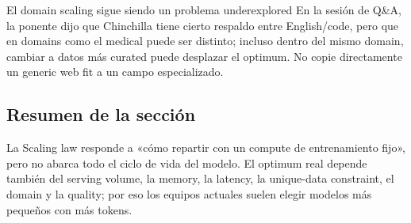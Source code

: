 
\begin{warningbox}{El domain scaling sigue siendo un problema underexplored}
En la sesión de Q\&A, la ponente dijo que Chinchilla tiene cierto respaldo entre English/code, pero que en domains como el medical puede ser distinto; incluso dentro del mismo domain, cambiar a datos más curated puede desplazar el optimum. No copie directamente un generic web fit a un campo especializado.
\end{warningbox}


\subsection{Resumen de la sección}

La Scaling law responde a «cómo repartir con un compute de entrenamiento fijo», pero no abarca todo el ciclo de vida del modelo. El optimum real depende también del serving volume, la memory, la latency, la unique-data constraint, el domain y la quality; por eso los equipos actuales suelen elegir modelos más pequeños con más tokens.
